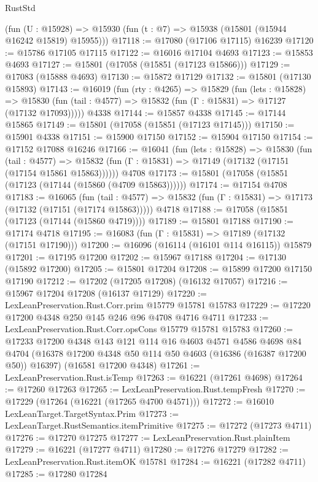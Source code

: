 \begin{lexlean}{RustStd}
\begin{coremodule}
    (fun (U : @15928) => @15930 (fun (t : @7) => @15938 (@15801 (@15944 @16242 @15819) @15955)))
@17118 := @17080 (@17106 @17115) @16239
@17120 := @15786 @17105 @17115
@17122 := @16016 @17104 @4693
@17123 := @15853 @4693
@17127 := @15801 (@17058 (@15851 (@17123 @15866)))
@17129 := @17083 (@15888 @4693)
@17130 := @15872 @17129
@17132 := @15801 (@17130 @15893)
@17143 := @16019
    (fun (rty : @4265) =>
    @15829
      (fun (lets : @15828) =>
      @15830 (fun (tail : @4577) => @15832 (fun (Γ : @15831) => @17127 (@17132 @17093)))))
    @4338
@17144 := @15857 @4338
@17145 := @17144 @15865
@17149 := @15801 (@17058 (@15851 (@17123 @17145)))
@17150 := @15901 @4338
@17151 := @15900 @17150
@17152 := @15904 @17150
@17154 := @17152 @17088 @16246
@17166 := @16041
    (fun (lets : @15828) =>
    @15830
      (fun (tail : @4577) =>
      @15832 (fun (Γ : @15831) => @17149 (@17132 (@17151 (@17154 @15861 @15863))))))
    @4708
@17173 := @15801 (@17058 (@15851 (@17123 (@17144 (@15860 (@4709 @15863))))))
@17174 := @17154 @4708
@17183 := @16065
    (fun (tail : @4577) => @15832 (fun (Γ : @15831) => @17173 (@17132 (@17151 (@17174 @15863)))))
    @4718
@17188 := @17058 (@15851 (@17123 (@17144 (@15860 @4719))))
@17189 := @15801 @17188
@17190 := @17174 @4718
@17195 := @16083 (fun (Γ : @15831) => @17189 (@17132 (@17151 @17190)))
@17200 := @16096 (@16114 (@16101 @114 @16115)) @15879
@17201 := @17195 @17200
@17202 := @15967 @17188
@17204 := @17130 (@15892 @17200)
@17205 := @15801 @17204
@17208 := @15899 @17200 @17150 @17190
@17212 := @17202 (@17205 @17208) (@16132 @17057)
@17216 := @15967 @17204 @17208 (@16137 @17129)
@17220 := LexLeanPreservation.Rust.Corr.prim @15779 @15781 @15783
@17229 := @17220 @17200 @4348 @250 @145 @246 @96 @4708 @4716 @4711
@17233 := LexLeanPreservation.Rust.Corr.opsCons @15779 @15781 @15783
@17260 := @17233
    @17200
    @4348
    @143
    @121
    @114
    @16
    @4603
    @4571
    @4586
    @4698
    @84
    @4704
    (@16378 @17200 @4348 @50 @114 @50 @4603 (@16386 (@16387 @17200 @50)) @16397)
    (@16581 @17200 @4348)
@17261 := LexLeanPreservation.Rust.isTemp
@17263 := @16221 (@17261 @4698)
@17264 := @17260 @17263
@17265 := LexLeanPreservation.Rust.tempFresh
@17270 := @17229 (@17264 (@16221 (@17265 @4700 @4571)))
@17272 := @16010 LexLeanTarget.TargetSyntax.Prim
@17273 := LexLeanTarget.RustSemantics.itemPrimitive
@17275 := @17272 (@17273 @4711)
@17276 := @17270 @17275
@17277 := LexLeanPreservation.Rust.plainItem
@17279 := @16221 (@17277 @4711)
@17280 := @17276 @17279
@17282 := LexLeanPreservation.Rust.itemOK @15781
@17284 := @16221 (@17282 @4711)
@17285 := @17280 @17284

\end{coremodule}
\end{lexlean}
